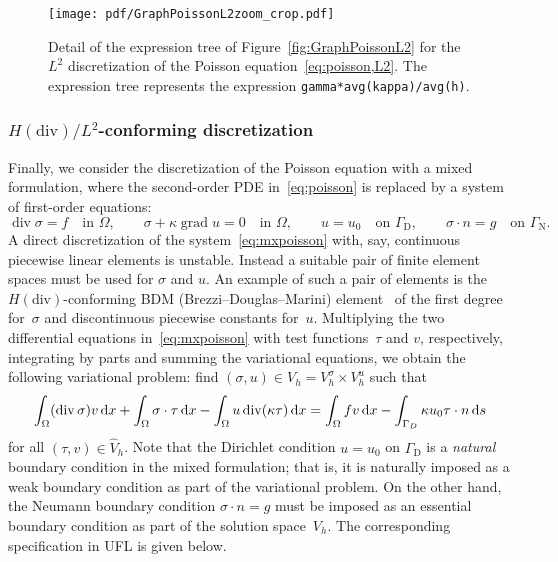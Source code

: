 \documentclass[prodmode,acmtoms]{acmsmall}
\DeclareMathOperator{\Div}{div}
\DeclareMathOperator{\Grad}{grad}
\newcommand{\uflc}[1]{\texttt{#1}}
\newcommand{\dx}{\dif{}x}
\newcommand{\ds}{\dif{}s}
\newcommand{\GammaD}{\Gamma_{\mathrm{D}}}
\newcommand{\GammaN}{\Gamma_{\mathrm{N}}}
\begin{document}
\begin{figure}
  \centering
  \texttt{[image: pdf/GraphPoissonL2zoom\_crop.pdf]}
  \caption{Detail of the expression tree of
    Figure~\ref{fig:GraphPoissonL2} for the $L^2$ discretization of
    the Poisson equation~\eqref{eq:poisson,L2}. The expression tree
    represents the expression \uflc{gamma*avg(kappa)/avg(h)}.}
  \label{fig:GraphPoissonL2zoom}
\end{figure}

\subsubsection{$H(\mathrm{div})/L^2$-conforming discretization}

Finally, we consider the discretization of the Poisson equation with a
mixed formulation, where the second-order PDE in~\eqref{eq:poisson} is
replaced by a system of first-order equations:
\begin{equation}
  \label{eq:mxpoisson}
              \Div \sigma = f     \quad \text{in } \Omega,  \qquad
  \sigma + \kappa \Grad u = 0     \quad \text{in } \Omega,  \qquad
                        u = u_0   \quad \text{on } \GammaD, \qquad
           \sigma \cdot n = g     \quad \text{on } \GammaN.
\end{equation}
A direct discretization of the system~\eqref{eq:mxpoisson} with, say,
continuous piecewise linear elements is unstable. Instead a suitable
pair of finite element spaces must be used for $\sigma$ and $u$. An
example of such a pair of elements is the $H(\mathrm{div})$-conforming
BDM (Brezzi--Douglas--Marini) element~\citep{BrezziDouglasMarini1985}
of the first degree for~$\sigma$ and discontinuous piecewise constants
for~$u$. Multiplying the two differential equations
in~\eqref{eq:mxpoisson} with test functions~$\tau$ and $v$,
respectively, integrating by parts and summing the variational
equations, we obtain the following variational problem: find $(\sigma,
u) \in V_h = V_h^{\sigma} \times V_h^u$ such that
\begin{equation}
  \int_{\Omega} (\Div \sigma) v \dx +
  \int_{\Omega} \sigma \cdot \tau \dx -
  \int_{\Omega} u \Div (\kappa\tau) \dx
  =
  \int_{\Omega} fv \dx -
  \int_{\Gamma_D} \kappa u_0 \tau \cdot n \ds
\end{equation}
for all $(\tau, v) \in \hat{V}_h$. Note that the Dirichlet condition
$u = u_0$ on $\GammaD$ is a \emph{natural} boundary condition in the
mixed formulation; that is, it is naturally imposed as a weak boundary
condition as part of the variational problem. On the other hand, the
Neumann boundary condition $\sigma \cdot n = g$ must be imposed as an
essential boundary condition as part of the solution space~$V_h$. The
corresponding specification in UFL is given below.
\end{document}
